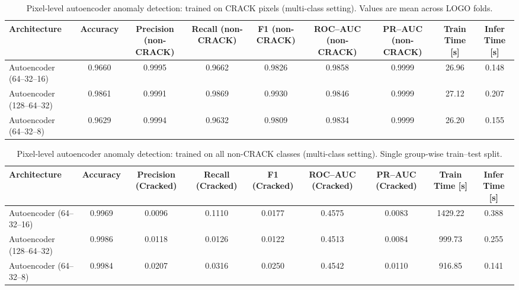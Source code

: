 \begin{table}[!htbp]
    \centering
    \small
    \caption[Autoencoder anomaly detection: CRACK-only (full CV)]{Pixel-level autoencoder anomaly detection: trained on CRACK pixels (multi-class setting). Values are mean across LOGO folds.}
    \label{tab:autoencoder_pixel_results_crack_only_multiclass_full}
    \renewcommand{\arraystretch}{1.2}
    \setlength{\tabcolsep}{5pt}
    \begin{adjustbox}{max width=\linewidth,center}
    \begin{tabular}{@{}lcccccccc@{}}
        \toprule
        Architecture & Accuracy & Precision (non-CRACK) & Recall (non-CRACK) & F1 (non-CRACK) & ROC--AUC (non-CRACK) & PR--AUC (non-CRACK) & Train Time [s] & Infer Time [s] \\
        \midrule
        Autoencoder (64--32--16) & 0.9660 & 0.9995 & 0.9662 & 0.9826 & 0.9858 & 0.9999 & 26.96 & 0.148 \\
        Autoencoder (128--64--32) & 0.9861 & 0.9991 & 0.9869 & 0.9930 & 0.9846 & 0.9999 & 27.12 & 0.207 \\
        Autoencoder (64--32--8) & 0.9629 & 0.9994 & 0.9632 & 0.9809 & 0.9834 & 0.9999 & 26.20 & 0.155 \\
        \bottomrule
    \end{tabular}
    \end{adjustbox}
\end{table}

\begin{table}[!htbp]
    \centering
    \small
    \caption[Autoencoder anomaly detection: non-CRACK training (full CV)]{Pixel-level autoencoder anomaly detection: trained on all non-CRACK classes (multi-class setting). Single group-wise train--test split.}
    \label{tab:autoencoder_pixel_results_noncrack_multiclass_full}
    \renewcommand{\arraystretch}{1.2}
    \setlength{\tabcolsep}{5pt}
    \begin{adjustbox}{max width=\linewidth,center}
    \begin{tabular}{@{}lcccccccc@{}}
        \toprule
        Architecture & Accuracy & Precision (Cracked) & Recall (Cracked) & F1 (Cracked) & ROC--AUC (Cracked) & PR--AUC (Cracked) & Train Time [s] & Infer Time [s] \\
        \midrule
        Autoencoder (64--32--16) & 0.9969 & 0.0096 & 0.1110 & 0.0177 & 0.4575 & 0.0083 & 1429.22 & 0.388 \\
        Autoencoder (128--64--32) & 0.9986 & 0.0118 & 0.0126 & 0.0122 & 0.4513 & 0.0084 & 999.73 & 0.255 \\
        Autoencoder (64--32--8) & 0.9984 & 0.0207 & 0.0316 & 0.0250 & 0.4542 & 0.0110 & 916.85 & 0.141 \\
        \bottomrule
    \end{tabular}
    \end{adjustbox}
\end{table}

